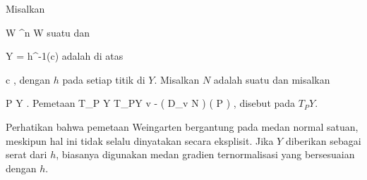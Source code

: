 {}
{

Misalkan

\mavergleichskette
{\vergleichskette
{ W
}
{ \subseteq }{ \R^n
}
{  }{
}
{    }{
}
{   }{
}
}
{}{}{}
 { W } { \R
} {}
suatu
dan

\mavergleichskette
{\vergleichskette
{ Y
}
{ = }{ h^{-1}(c)
}
{  }{
}
{    }{
}
{   }{
}
}
{}{}{}
adalah
di atas

\mavergleichskette
{\vergleichskette
{ c
}
{ \in }{ \R
}
{  }{
}
{    }{
}
{   }{
}
}
{}{}{,}
dengan $h$
pada setiap titik di $Y$. Misalkan $N$ adalah suatu
dan misalkan

\mavergleichskette
{\vergleichskette
{ P
}
{ \in }{ Y
}
{  }{
}
{    }{
}
{   }{
}
}
{}{}{.}
Pemetaan
 {T_P Y} { T_PY
} { v } { - \left(  D_{v}  N   \right) \left(   P  \right)
} {,}
disebut
pada $T_PY$.

}

Perhatikan bahwa pemetaan Weingarten bergantung pada medan normal satuan, meskipun hal ini tidak selalu dinyatakan secara eksplisit. Jika $Y$ diberikan sebagai serat dari $h$, biasanya digunakan medan gradien ternormalisasi yang bersesuaian dengan $h$.

